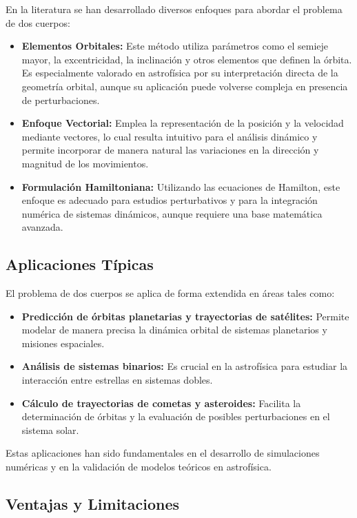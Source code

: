 En la literatura se han desarrollado diversos enfoques para abordar el problema de dos cuerpos:
\begin{itemize}
    \item \textbf{Elementos Orbitales:} Este método utiliza parámetros como el semieje mayor, la excentricidad, la inclinación y otros elementos que definen la órbita. Es especialmente valorado en astrofísica por su interpretación directa de la geometría orbital, aunque su aplicación puede volverse compleja en presencia de perturbaciones.
    \item \textbf{Enfoque Vectorial:} Emplea la representación de la posición y la velocidad mediante vectores, lo cual resulta intuitivo para el análisis dinámico y permite incorporar de manera natural las variaciones en la dirección y magnitud de los movimientos.
    \item \textbf{Formulación Hamiltoniana:} Utilizando las ecuaciones de Hamilton, este enfoque es adecuado para estudios perturbativos y para la integración numérica de sistemas dinámicos, aunque requiere una base matemática avanzada. %
\end{itemize}

\subsection{Aplicaciones Típicas}

El problema de dos cuerpos se aplica de forma extendida en áreas tales como:
\begin{itemize}
    \item \textbf{Predicción de órbitas planetarias y trayectorias de satélites:} Permite modelar de manera precisa la dinámica orbital de sistemas planetarios y misiones espaciales.
    \item \textbf{Análisis de sistemas binarios:} Es crucial en la astrofísica para estudiar la interacción entre estrellas en sistemas dobles.
    \item \textbf{Cálculo de trayectorias de cometas y asteroides:} Facilita la determinación de órbitas y la evaluación de posibles perturbaciones en el sistema solar.
\end{itemize}
Estas aplicaciones han sido fundamentales en el desarrollo de simulaciones numéricas y en la validación de modelos teóricos en astrofísica. %

\subsection{Ventajas y Limitaciones}

